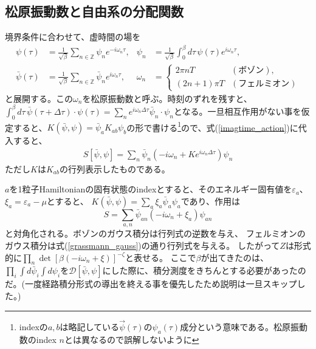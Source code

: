 \documentclass[a4paper,12pt]{jsarticle}
\begin{document}
\subsection{松原振動数と自由系の分配関数}
境界条件に合わせて、虚時間の場を
\begin{align}
  \psi(\tau)&=\frac{1}{\sqrt{\beta}}\sum_{n\in\mathbb Z}\psi_n e^{-i\omega_n\tau},
  &\psi_n&=\frac{1}{\sqrt{\beta}}\int_0^\beta d\tau\,\psi(\tau)e^{i\omega_n\tau},\\
  \bar\psi(\tau)&=\frac{1}{\sqrt{\beta}}\sum_{n\in\mathbb Z}
       \bar\psi_n e^{i\omega_n\tau},
  &\omega_n&=
  \begin{cases}
    2\pi nT & (\text{ボゾン}),\\
    (2n+1)\pi T & (\text{フェルミオン})
  \end{cases}
\end{align}
と展開する。この$\omega_n$を松原振動数と呼ぶ。時刻のずれを残すと、
$\int_0^\beta d\tau\,\bar\psi(\tau+\Delta\tau)\cdot\psi(\tau)
=\sum_n e^{i\omega_n\Delta\tau}\bar\psi_n\cdot\psi_n$となる。一旦相互作用がない事を仮定すると、$K(\bar\psi, \psi) = \bar\psi_a K_{ab}\psi_b$の形で書ける\footnote{indexの$a,b$は略記している$\vec{\psi}(\tau)$の$\psi_a(\tau)$成分という意味である。松原振動数のindex $n$とは異なるので誤解しないように}ので、式(\ref{imagtime_action})に代入すると、
\begin{align}
  S[\bar\psi,\psi] = \sum_n \bar\psi_n (-i\omega_n + Ke^{i\omega_n\Delta\tau}) \psi_n 
\end{align}
ただし$K$は$K_{ab}$の行列表示したものである。

$a$を1粒子Hamiltonianの固有状態のindexとすると、そのエネルギー固有値を$\varepsilon_a$、$\xi_a=\varepsilon_a-\mu$とすると、
$K(\bar\psi, \psi) = \sum_a \xi_a \bar\psi_a\psi_a$であり、作用は
\begin{equation}
  S=\sum_{a,n}\bar\psi_{an}(-i\omega_n+\xi_a)\psi_{an}\label{matsubara_action}
\end{equation}
と対角化される。ボゾンのガウス積分は行列式の逆数を与え、
フェルミオンのガウス積分は式(\ref{grassmann_gauss})の通り行列式を与える。
したがって$Z$は形式的に$\prod_n\det[\beta(-i\omega_n+\xi)]^{-\zeta}$と表せる。
ここで$\beta$が出てきたのは、$\prod_i\int d\bar\psi_i \int d\psi_i$を$\mathcal{D}[\bar\psi, \psi]$にした際に、積分測度をきちんとする必要があったのだ。(一度経路積分形式の導出を終える事を優先したため説明は一旦スキップした。)
\end{document}
